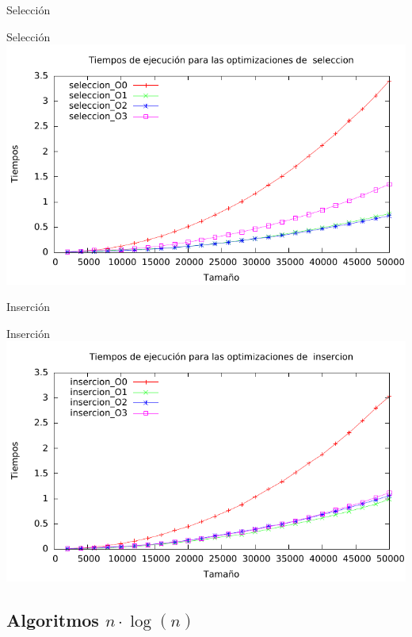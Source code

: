 \documentclass[10pt,compress,usetitleprogressbar,mathserif]{beamer}
\begin{document}
\begin{frame}{Selección}
	
\end{frame}

\begin{frame}{Selección}
	\includegraphics[width = \textwidth ]{img/seleccion_optim_g.pdf}
\end{frame}

\begin{frame}{Inserción}
	
\end{frame}

\begin{frame}{Inserción}
	\includegraphics[width = \textwidth ]{img/insercion_optim_g.pdf}
\end{frame}

\subsection{Algoritmos $n \cdot \log(n)$}
\end{document}
